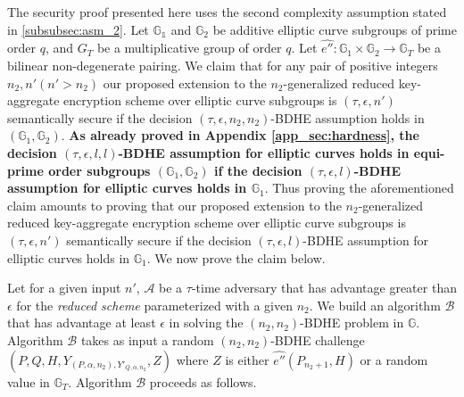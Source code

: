 The security proof presented here uses the second complexity assumption stated in \ref{subsubsec:asm_2}. Let $\mathbb{G_1}$ and $\mathbb{G}_2$ be additive elliptic curve subgroups of prime order $q$, and $G_T$ be a multiplicative group of order $q$. Let $\hat{e''}:\mathbb{G}_1 \times \mathbb{G}_2\longrightarrow\mathbb{G}_T$ be a bilinear non-degenerate pairing. We claim that for any pair of positive integers $n_2,n' (n'>n_2)$ our proposed extension to the $n_2$-generalized reduced key-aggregate encryption scheme over elliptic curve subgroups is $(\tau,\epsilon,n')$ semantically secure if the decision $(\tau,\epsilon,n_2,n_2)$-BDHE assumption holds in $(\mathbb{G}_1,\mathbb{G}_2)$. \textbf{As already proved in Appendix \ref{app_sec:hardness}, the decision $(\tau,\epsilon,l,l)$-BDHE assumption for elliptic curves holds in equi-prime order subgroups $(\mathbb{G}_1,\mathbb{G}_2)$ if the decision $(\tau,\epsilon,l)$-BDHE assumption for elliptic curves holds in $\mathbb{G}_1$}. Thus proving the aforementioned 
claim amounts to proving that our proposed extension to the $n_2$-generalized reduced key-aggregate encryption scheme over elliptic curve subgroups is $(\tau,\epsilon,n')$ semantically secure if the decision $(\tau,\epsilon,l)$-BDHE assumption for elliptic curves holds in $\mathbb{G}_1$. We now prove the claim below.

\textbf{} Let for a given input $n'$, $\mathcal{A}$ be a $\tau$-time adversary that has advantage greater than $\epsilon$ for the \emph{reduced scheme} parameterized with a given $n_2$. We build an algorithm $\mathcal{B}$ that has advantage at least $\epsilon$ in solving the $(n_2,n_2)$-BDHE problem in $\mathbb{G}$. Algorithm $\mathcal{B}$ takes as input a random $(n_2,n_2)$-BDHE challenge $(P,Q,H,Y_{(P,\alpha,n_2),Y'_{Q,\alpha,n_2}},Z)$ where $Z$ is either $\hat{e''}(P_{n_2+1},H)$ or a random value in $\mathbb{G}_T$. Algorithm $\mathcal{B}$ proceeds as follows.

